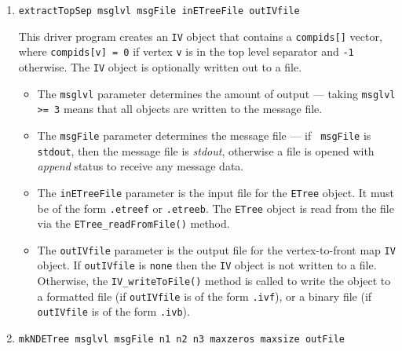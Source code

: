\begin{enumerate}
\begin{itemize}
{\tt *.ivf}), or
a binary file (if {\tt outIVfile} is of the form {\tt *.ivb}).
\item
The {\tt outETreeFile} parameter is the output file for the 
{\tt ETree} object. 
If {\tt outETreeFile} is {\tt none} then the {\tt ETree} object is not
written to a file. 
Otherwise, the {\tt ETree\_writeToFile()} method is called to write
the object to 
a formatted file (if {\tt outETreeFile} is of the form 
{\tt *.etreef}),
or
a binary file (if {\tt outETreeFile} is of the form {\tt *.etreeb}).
\end{itemize}
\item
\begin{verbatim}
extractTopSep msglvl msgFile inETreeFile outIVfile
\end{verbatim}
This driver program creates an {\tt IV} object that contains a 
{\tt compids[]} vector, where {\tt compids[v] = 0} if vertex {\tt v} 
is in the top level separator and {\tt -1} otherwise.
The {\tt IV} object is optionally written out to a file.
\begin{itemize}
\item
The {\tt msglvl} parameter determines the amount of output ---
taking {\tt msglvl >= 3} means that all objects are written
to the message file.
\item
The {\tt msgFile} parameter determines the message file --- if {\tt
msgFile} is {\tt stdout}, then the message file is {\it stdout},
otherwise a file is opened with {\it append} status to receive any
message data.
\item
The {\tt inETreeFile} parameter is the input file for the {\tt ETree}
object. It must be of the form {\tt *.etreef} or {\tt *.etreeb}.
The {\tt ETree} object is read from the file via the
{\tt ETree\_readFromFile()} method.
\item
The {\tt outIVfile} parameter is the output file for the 
vertex-to-front map {\tt IV} object. 
If {\tt outIVfile} is {\tt none} then the {\tt IV} object is not
written to a file. 
Otherwise, the {\tt IV\_writeToFile()} method is called to write
the object to a formatted file (if {\tt outIVfile} is of the form 
{\tt *.ivf}), or
a binary file (if {\tt outIVfile} is of the form {\tt *.ivb}).
\end{itemize}
\item
\begin{verbatim}
mkNDETree msglvl msgFile n1 n2 n3 maxzeros maxsize outFile

\end{verbatim}
\end{enumerate}
